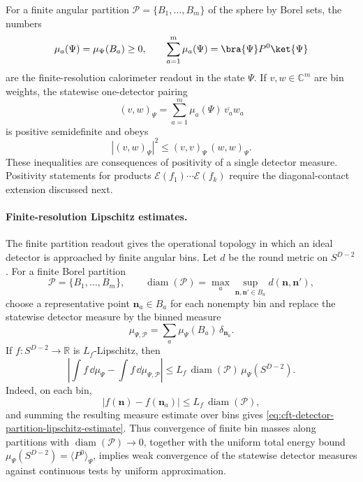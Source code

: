 For a finite angular partition
\(\mathcal P=\{B_1,\ldots,B_m\}\) of the sphere by Borel sets, the numbers
\[
  \mu_a(\Psi)=\mu_\Psi(B_a)\geq0,\qquad
  \sum_{a=1}^m\mu_a(\Psi)=\bra{\Psi}P^0\ket{\Psi}
\]
are the finite-resolution calorimeter readout in the state \(\Psi\).  If
\(v,w\in\mathbb C^m\) are bin weights, the statewise one-detector pairing
\[
  (v,w)_\Psi
  =
  \sum_{a=1}^m \mu_a(\Psi)\,\overline{v_a}w_a
\]
is positive semidefinite and obeys
\begin{equation}
  |(v,w)_\Psi|^2
  \leq
  (v,v)_\Psi\,(w,w)_\Psi .
  \label{eq:cft-detector-bin-cauchy-schwarz}
\end{equation}
These inequalities are consequences of positivity of a single detector
measure.  Positivity statements for products
\(\mathcal E(f_1)\cdots\mathcal E(f_k)\) require the diagonal-contact
extension discussed next.

\paragraph{Finite-resolution Lipschitz estimates.}
The finite partition readout gives the operational topology in which an ideal
detector is approached by finite angular bins.  Let \(d\) be the round metric on
\(S^{D-2}\).  For a
finite Borel partition
\[
  \mathcal P=\{B_1,\ldots,B_m\},
  \qquad
  \operatorname{diam}(\mathcal P)
  =
  \max_a\sup_{\mathbf n,\mathbf n'\in B_a}d(\mathbf n,\mathbf n'),
\]
choose a representative point \(\mathbf n_a\in B_a\) for each nonempty bin and
replace the statewise detector measure by the binned measure
\[
  \mu_{\Psi,\mathcal P}
  =
  \sum_a\mu_\Psi(B_a)\,\delta_{\mathbf n_a}.
\]
If \(f:S^{D-2}\to\mathbb R\) is \(L_f\)-Lipschitz, then
\begin{equation}
  \left|
  \int f\,\dd\mu_\Psi
  -
  \int f\,\dd\mu_{\Psi,\mathcal P}
  \right|
  \leq
  L_f\,\operatorname{diam}(\mathcal P)\,\mu_\Psi(S^{D-2}).
  \label{eq:cft-detector-partition-lipschitz-estimate}
\end{equation}
Indeed, on each bin,
\[
  |f(\mathbf n)-f(\mathbf n_a)|
  \leq
  L_f\,\operatorname{diam}(\mathcal P),
\]
and summing the resulting measure estimate over bins gives
\eqref{eq:cft-detector-partition-lipschitz-estimate}.  Thus convergence of
finite bin masses along partitions with
\(\operatorname{diam}(\mathcal P)\to0\), together with the uniform total
energy bound \(\mu_\Psi(S^{D-2})=\langle P^0\rangle_\Psi\), implies weak
convergence of the statewise detector measures against continuous tests by
uniform approximation.

